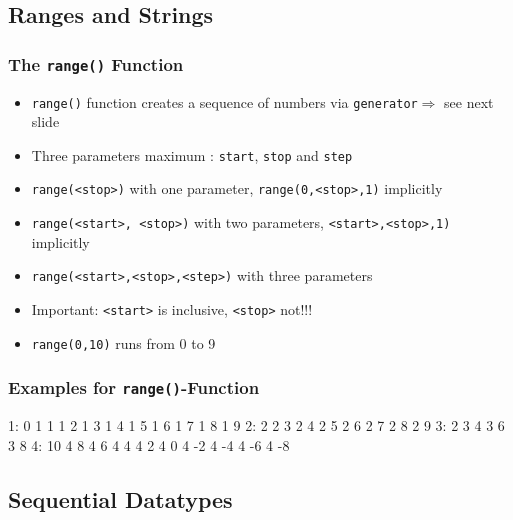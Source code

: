 \documentclass[english]{beamer}
\newcommand{\ta}[1]{\textattachfile[color=1 0 0]{#1}{Code}}
\begin{document}
\subsection{Ranges and Strings}



\begin{frame}[containsverbatim]
\frametitle{The \texttt{range()} Function}

\begin{itemize}
\item \texttt{range()} function creates a sequence of numbers via \texttt{generator}$\Rightarrow$ see next slide
\item Three parameters maximum : \texttt{start}, \texttt{stop} and \texttt{step}
\item \texttt{range(<stop>)} with one parameter,  \texttt{range(0,<stop>,1)} implicitly
\item \texttt{range(<start>, <stop>)} with two parameters, \texttt{<start>,<stop>,1)} implicitly 
\item \texttt{range(<start>,<stop>,<step>)} with three parameters
\item Important: \texttt{<start>} is inclusive, \texttt{<stop>} not!!!
\item \texttt{range(0,10)} runs from 0 to 9
\end{itemize}
\end{frame}

\begin{frame}[containsverbatim]
\frametitle{Examples for \texttt{range()}-Function}



\begin{ausgabe}
1: 0	1 1	1 2	1 3	1 4	1 5	1 6	1 7	1 8	1 9
2: 2	2 3	2 4	2 5	2 6	2 7	2 8	2 9		
3: 2	3 4	3 6	3 8						
4: 10	4 8	4 6	4 4	4 2	4 0	4 -2	4 -4	4 -6	4 -8
\end{ausgabe}

\end{frame}


\subsection{Sequential Datatypes}
\end{document}
